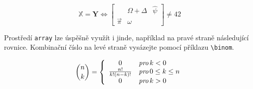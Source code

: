 \documentclass[twocolumn, 11pt, a4paper]{article}[16.03.2023]
\begin{document}
$$\mathbb{X}= \mathbf{Y} \Longleftrightarrow \left[
    \begin{array}{ccc}
        & \Omega+\Delta & \hat{\psi}\\
        \vec{\pi} & \omega & 
    \end{array}
\right] \ne 42$$

Prostředí \verb|array| lze úspěšně využít i jinde, například 
na pravé straně následující rovnice. Kombinační číslo na levé straně vysázejte pomocí příklazu \verb|\binom|.

$$\binom{n}{k} = 
\left\{
\begin{array}{c l}
0 & \emph{pro}\,k < 0 \\
\frac{n!}{k!(n-k)!} &  \emph{pro}\,0\le k \le n \\
0 & \emph{pro}\,k > 0
\end{array}
\right. $$
\label{1}
\end{document}
